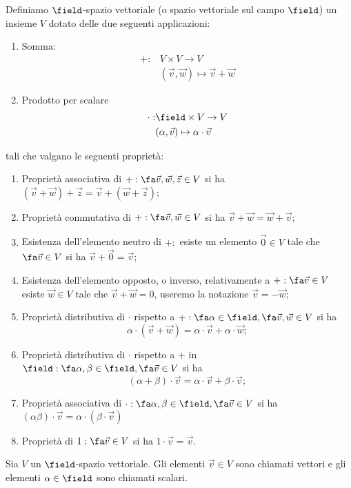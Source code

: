 \begin{definition}
	Definiamo $\field$-spazio vettoriale (o spazio vettoriale sul campo $\field$) un insieme $V$ dotato delle due seguenti applicazioni:
	\begin{enumerate}
		\item Somma:
		      \begin{align*}
			      +: & V \times V \rightarrow V                     \\
			         & (\vec{v}, \vec{w}) \mapsto \vec{v} + \vec{w}
		      \end{align*}
		\item Prodotto per scalare
		      \begin{align*}
			      \cdot: & \field \times V \rightarrow V                  \\
			             & (\alpha, \vec{v}) \mapsto \alpha \cdot \vec{v}
		      \end{align*}
	\end{enumerate}
	tali che valgano le seguenti proprietà:
	\begin{enumerate}
		\renewcommand{\labelenumi}{(P\arabic{enumi})}
		\item Proprietà associativa di $+: \fa \vec{v}, \vec{w}, \vec{z} \in V$ si ha $(\vec{v} + \vec{w}) + \vec{z} = \vec{v} + (\vec{w} + \vec{z})$;
		\item Proprietà commutativa di $+: \fa \vec{v}, \vec{w} \in V$ si ha $\vec{v} + \vec{w} = \vec{w} + \vec{v}$;
		\item Esistenza dell'elemento neutro di $+: $ esiste un elemento $\vec{0} \in V$ tale che $\fa \vec{v} \in V$ si ha $\vec{v} + \vec{0} = \vec{v}$;
		\item Esistenza dell'elemento opposto, o inverso, relativamente a $+: \fa \vec{v} \in V$ esiste $\vec{w} \in V$ tale che $\vec{v} + \vec{w} = 0$, useremo la notazione $\vec{v} = -\vec{w}$;
		\item Proprietà distributiva di $\cdot$ rispetto a $+: \fa \alpha \in \field, \fa \vec{v}, \vec{w} \in V$ si ha
		      \begin{equation}
			      \alpha \cdot (\vec{v} + \vec{w}) = \alpha \cdot \vec{v} + \alpha \cdot \vec{w};
		      \end{equation}
		\item Proprietà distributiva di $\cdot$ rispetto a $+$ in $\field: \fa \alpha, \beta \in \field, \fa \vec{v} \in V$ si ha
		      \begin{equation}
			      (\alpha + \beta) \cdot \vec{v} = \alpha \cdot \vec{v} + \beta \cdot \vec{v};
		      \end{equation}
		\item Proprietà associativa di $\cdot: \fa \alpha, \beta \in \field, \fa \vec{v} \in V$ si ha $(\alpha\beta) \cdot \vec{v} = \alpha \cdot (\beta \cdot \vec{v})$
		\item Proprietà di $1: \fa \vec{v} \in V$ si ha $1 \cdot \vec{v} = \vec{v}$.
	\end{enumerate}
\end{definition}
Sia $V$ un $\field$-spazio vettoriale. Gli elementi $\vec{v} \in V$ sono chiamati vettori e gli elementi $\alpha \in \field$ sono chiamati scalari.

